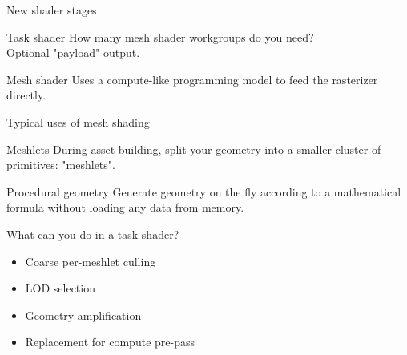 \documentclass[aspectratio=169,t,xcolor=table]{beamer}
\begin{document}
\begin{frame}{New shader stages}

    \LARGE

    \begin{block}{Task shader}
        How many mesh shader workgroups do you need? \\
        Optional "payload" output.
    \end{block}

    \begin{block}{Mesh shader}
        Uses a compute-like programming model to feed
        the rasterizer directly.
    \end{block}

\end{frame}

\begin{frame}{Typical uses of mesh shading}

    \LARGE

    \begin{block}{Meshlets}
        During asset building, split your geometry into a smaller cluster of primitives: "meshlets". 
    \end{block}

    \begin{block}{Procedural geometry}
        Generate geometry on the fly according to a mathematical formula without loading any data from memory.
    \end{block}

\end{frame}

\begin{frame}{What can you do in a task shader?}

    \LARGE

    \begin{itemize}
      	\item Coarse per-meshlet culling
      	\item LOD selection
      	\item Geometry amplification
      	\item Replacement for compute pre-pass
    \end{itemize}

\end{frame}
\end{document}
